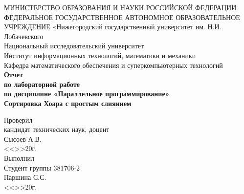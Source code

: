 \documentclass[a4paper,final]{report}
\begin{document}
	\begin{titlepage}
	
		\begin{center} 
			\MakeUppercase{Министерство образования и науки Российской федерации} \linebreak  
			\MakeUppercase{Федеральное государственное автономное образовательное учреждение} \linebreak
			«Нижегородский государственный университет им. Н.И. Лобачевского\\[0.2cm] 
			Национальный исследовательский университет\\[0.1cm] 
			Институт информационных технологий, математики и механики \\[0.1cm]  
			Кафедра математического обеспечения и суперкомпьютерных технологий\\[2.5cm]
			{\huge \bfseries Отчет \\[0.1cm]
				\Large \mdseries по лабораторной работе \\[0,1cm]
				\Large \mdseries по дисциплине «Параллельное программирование» \\[1cm]
				\Large \bfseries Сортировка Хоара с простым слиянием}\\[3cm]
		\end{center}
    
		\begin{flushright} \large
			{Проверил} \\[0.1cm]
			{кандидат технических наук, доцент}\\[0.1cm]
			{\underline{\hspace{2,35in}} Сысоев А.В.}\\[0.1cm]
			{<<\underline{\hspace{0,25in}}>>\underline{\hspace{2,55in}}20\underline{\hspace{0,3in}}г.} \\[0.1cm]
			{Выполнил} \\[0.1cm]
			{Студент группы 381706-2} \\[0.1cm]
			{\underline{\hspace{2,1in}} Паршина С.С.} \\[0.1cm]
			{<<\underline{\hspace{0,25in}}>>\underline{\hspace{2,55in}}20\underline{\hspace{0,3in}}г.} \\[3cm]
		\end{flushright}
		
	\end{titlepage}
	
\end{document}

